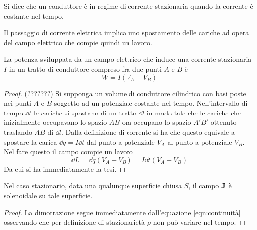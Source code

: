 \begin{defn}
    Si dice che un conduttore è in regime di corrente stazionaria quando la corrente è costante nel tempo.
\end{defn}

Il passaggio di corrente elettrica implica uno spostamento delle cariche ad opera del campo elettrico che compie quindi un lavoro.
\begin{thm}
    La potenza sviluppata da un campo elettrico che induce una corrente stazionaria $I$ in un tratto di conduttore compreso fra due punti $A$ e $B$ è
    \begin{equation}
        \label{eqn:potenza_stazionaria}
        W=I(V_A-V_B)
    \end{equation}
\end{thm}
\begin{proof}
    (???????)
    Si supponga un volume di conduttore cilindrico con basi poste nei punti $A$ e $B$
    soggetto ad un potenziale costante nel tempo. Nell'intervallo di tempo $\dd{t}$ le cariche
    si spostano di un tratto $\dd{l}$ in modo tale che le cariche che inizialmente occupavano lo spazio $AB$ ora occupano
    lo spazio $A'B'$ ottenuto traslando $AB$ di $\dd{l}$. Dalla definizione di corrente si ha che questo equivale a spostare
    la carica $\dd{q}=I\dd{t}$ dal punto a potenziale $V_A$ al punto a potenziale $V_B$. Nel fare questo il campo compie un lavoro
    \[
        \dd{L}=\dd{q}(V_A-V_B)=I\dd{t}(V_A-V_B)
    \]
    Da cui si ha immediatamente la tesi.
\end{proof}

\begin{thm}
    Nel caso stazionario, data una qualunque superficie chiusa $S$, il campo $\vb{J}$ è solenoidale su tale superficie.
\end{thm}
\begin{proof}
    La dimotrazione segue immediatamente dall'equazione \eqref{eqn:continuità}
    osservando che per definizione di stazionarietà $\rho$ non può variare nel tempo.
\end{proof}
